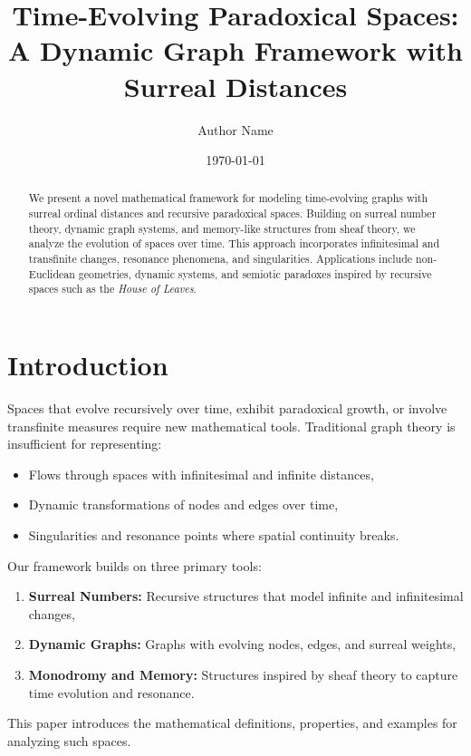 \documentclass[12pt]{article}
\title{Time-Evolving Paradoxical Spaces:\\A Dynamic Graph Framework with Surreal Distances}
\author{Author Name}
\date{\today}
\begin{document}
\maketitle

\begin{abstract}
We present a novel mathematical framework for modeling time-evolving graphs with surreal ordinal distances and recursive paradoxical spaces. Building on surreal number theory, dynamic graph systems, and memory-like structures from sheaf theory, we analyze the evolution of spaces over time. This approach incorporates infinitesimal and transfinite changes, resonance phenomena, and singularities. Applications include non-Euclidean geometries, dynamic systems, and semiotic paradoxes inspired by recursive spaces such as the \emph{House of Leaves}.
\end{abstract}

\tableofcontents

\section{Introduction}

Spaces that evolve recursively over time, exhibit paradoxical growth, or involve transfinite measures require new mathematical tools. Traditional graph theory is insufficient for representing:
\begin{itemize}
    \item Flows through spaces with infinitesimal and infinite distances,
    \item Dynamic transformations of nodes and edges over time,
    \item Singularities and resonance points where spatial continuity breaks.
\end{itemize}

Our framework builds on three primary tools:
\begin{enumerate}
    \item \textbf{Surreal Numbers:} Recursive structures that model infinite and infinitesimal changes,
    \item \textbf{Dynamic Graphs:} Graphs with evolving nodes, edges, and surreal weights,
    \item \textbf{Monodromy and Memory:} Structures inspired by sheaf theory to capture time evolution and resonance.
\end{enumerate}

This paper introduces the mathematical definitions, properties, and examples for analyzing such spaces.
\end{document}
